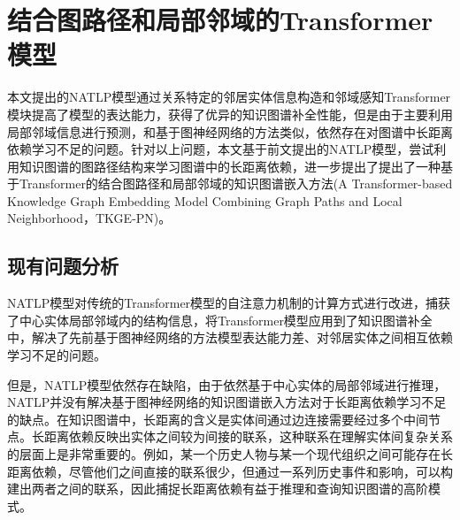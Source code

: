 \chapter{结合图路径和局部邻域的Transformer模型}


本文提出的NATLP模型通过关系特定的邻居实体信息构造和邻域感知Transformer模块提高了模型的表达能力，获得了优异的知识图谱补全性能，但是由于主要利用局部邻域信息进行预测，和基于图神经网络的方法类似，依然存在对图谱中长距离依赖学习不足的问题。针对以上问题，本文基于前文提出的NATLP模型，尝试利用知识图谱的图路径结构来学习图谱中的长距离依赖，进一步提出了提出了一种基于Transformer的结合图路径和局部邻域的知识图谱嵌入方法(A Transformer-based Knowledge Graph Embedding Model Combining Graph Paths and Local Neighborhood，TKGE-PN)。

\section{现有问题分析}
NATLP模型对传统的Transformer模型的自注意力机制的计算方式进行改进，捕获了中心实体局部邻域内的结构信息，将Transformer模型应用到了知识图谱补全中，解决了先前基于图神经网络的方法模型表达能力差、对邻居实体之间相互依赖学习不足的问题。

但是，NATLP模型依然存在缺陷，由于依然基于中心实体的局部邻域进行推理，NATLP并没有解决基于图神经网络的知识图谱嵌入方法对于长距离依赖学习不足的缺点。在知识图谱中，长距离的含义是实体间通过边连接需要经过多个中间节点。长距离依赖反映出实体之间较为间接的联系，这种联系在理解实体间复杂关系的层面上是非常重要的。例如，某一个历史人物与某一个现代组织之间可能存在长距离依赖，尽管他们之间直接的联系很少，但通过一系列历史事件和影响，可以构建出两者之间的联系，因此捕捉长距离依赖有益于推理和查询知识图谱的高阶模式。

